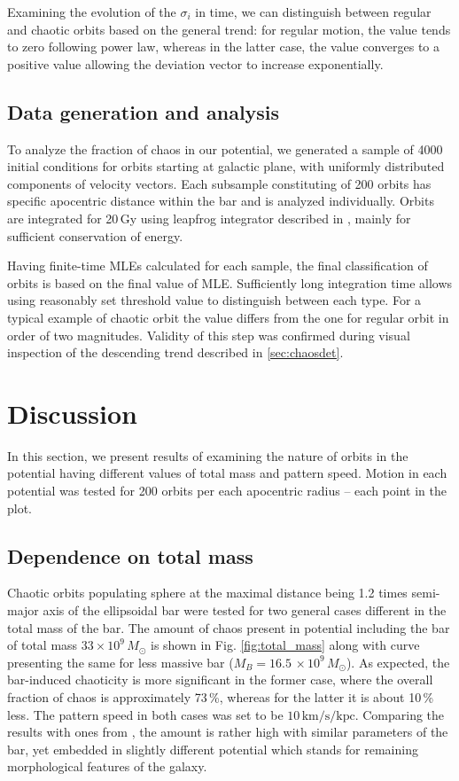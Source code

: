 \documentclass[a4paper,fleqn,usenatbib]{mnras}
\begin{document}
Examining the evolution of the $ \sigma_i $ in time, we can distinguish between regular and chaotic orbits based on the general trend: for regular motion, the value tends to zero following power law, whereas in the latter case, the value converges to a positive value allowing the deviation vector to increase exponentially.

\subsection{Data generation and analysis}

To analyze the fraction of chaos in our potential, we generated a sample of 4000 initial conditions for orbits starting at galactic plane, with uniformly distributed components of velocity vectors. Each subsample constituting of 200 orbits has specific apocentric distance within the bar and is analyzed individually. Orbits are integrated for 20\,Gy using leapfrog integrator described in \cite{BinneyTremaine:2008}, mainly for sufficient conservation of energy.

Having finite-time MLEs calculated for each sample, the final classification of orbits is based on the final value of MLE. Sufficiently long integration time allows using reasonably set threshold value to distinguish between each type. For a typical example of chaotic orbit the value differs from the one for regular orbit in order of two magnitudes. Validity of this step was confirmed during visual inspection of the descending trend described in \ref{sec:chaosdet}.

\section{Discussion}
In this section, we present results of examining the nature of orbits in the potential having different values of total mass and pattern speed. Motion in each potential was tested for 200 orbits per each apocentric radius -- each point in the plot. 

\subsection{Dependence on total mass}
Chaotic orbits populating sphere at the maximal distance being 1.2 times semi-major axis of the ellipsoidal bar were tested for two general cases different in the total mass of the bar. The amount of chaos present in potential including the bar of total mass $ 33\times 10^9\, M_{\odot} $ is shown in Fig. \ref{fig:total_mass} along with curve presenting the same for less massive bar ($ M_B = 16.5\,\times 10^9\, M_{\odot} $). As expected, the bar-induced chaoticity is more significant in the former case, where the overall fraction of chaos is approximately 73\,\%, whereas for the latter it is about 10\,\% less. The pattern speed in both cases was set to be $ 10\,\mathrm{km/s/kpc} $. Comparing the results with ones from \cite{MachadoManos:2016}, the amount is rather high with similar parameters of the bar, yet embedded in slightly different potential which stands for remaining morphological features of the galaxy.
\end{document}
